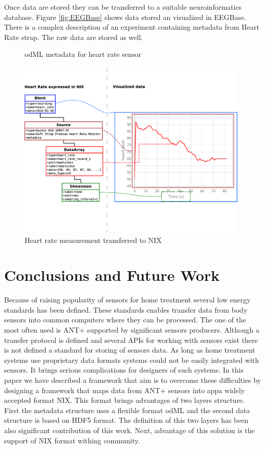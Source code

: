 \documentclass[conference]{IEEEtran}
\begin{document}
Once data are stored they can be transferred to a suitable neuroinformatics database. Figure \ref{fig:EEGBase} shows data stored an visualized in EEGBase. There is a complex description of an experiment containing metadata from Heart Rate strap. The raw data are stored as well.

\begin{figure}

\caption{\label{odML}odML metadata for heart rate sensor}
\end{figure}

\begin{figure}
\centering\includegraphics[width=11cm]{NIX-example}
\caption{\label{NIX-ex}Heart rate measurement transferred to NIX}
\end{figure}



\section{Conclusions and Future Work}\label{sec:future-work}

Because of raising popularity of sensors for home treatment several low energy standards has been defined. These standards enables transfer data from body sensors into common computers where they can be processed. The one of the most often used is ANT+ supported by significant sensors producers. Although a transfer protocol is defined and several APIs for working with sensors exist there is not defined a standard for storing of sensors data. As long as home treatment systems use proprietary data formats systems could not be easily integrated with sensors. It brings serious complications for designers of such systems. In this paper we have described a framework that aim is to overcome these difficulties by designing a framework that maps data from ANT+ sensors into appa widely accepted format NIX. This format brings advantages of two layers structure. First the metadata structure uses a flexible format odML and the second data structure is based on HDF5 format. The definition of this two layers has been also significant contribution of this work. Next, advantage of this solution is the support of NIX format withing community.
\end{document}
